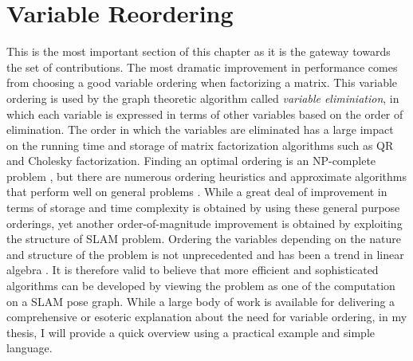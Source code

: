 \section{Variable Reordering}
This is the most important section of this chapter as it is the gateway towards the set of contributions. The most dramatic improvement in performance comes from choosing a good variable ordering when factorizing a matrix. This variable ordering is used by the graph theoretic algorithm called \textit{variable eliminiation}, in which each variable is expressed in terms of other variables based on the order of elimination. The order in which the variables are eliminated has a large impact on the running time and storage of matrix factorization algorithms such as QR and Cholesky factorization. Finding an optimal ordering is an NP-complete problem \cite{orderingnphard}, but there are numerous ordering heuristics and approximate algorithms that perform well on general problems \cite{colamd, heggernesordering}. While a great deal of improvement in terms of storage and time complexity is obtained by using these general purpose orderings, yet another order-of-magnitude improvement is obtained by exploiting the structure of SLAM problem. Ordering the variables depending on the nature and structure of the problem is not unprecedented and has been a trend in linear algebra \cite{latrend}. It is therefore valid to believe that more efficient and sophisticated algorithms can be developed by viewing the problem as one of the computation on a SLAM pose graph. While a large body of work is available for delivering a comprehensive or esoteric explanation about the need for variable ordering, in my thesis, I will provide a quick overview using a practical example and simple language.

